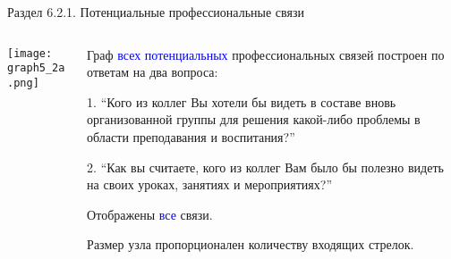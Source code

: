 \begin{frame}{Раздел 6.2.1. Потенциальные профессиональные связи}

\begin{columns}
\begin{column}{0.75\textwidth} 
\centering
          \texttt{[image: graph5\_2a.png]}
\end{column}
\begin{column}{0.25\textwidth} 

\tiny
Граф \textcolor{blue}{всех потенциальных} профессиональных связей построен по ответам на два вопроса:
\smallskip

1. ``Кого из коллег Вы хотели бы видеть в составе вновь организованной группы для решения какой-либо проблемы в области преподавания и воспитания?''
\smallskip

2. ``Как вы считаете, кого из коллег Вам было бы полезно видеть на своих уроках, занятиях и мероприятиях?''
\smallskip

Отображены \textcolor{blue}{все} связи. 
\smallskip

Размер узла пропорционален количеству входящих стрелок.

\end{column}
\end{columns}
\end{frame}


